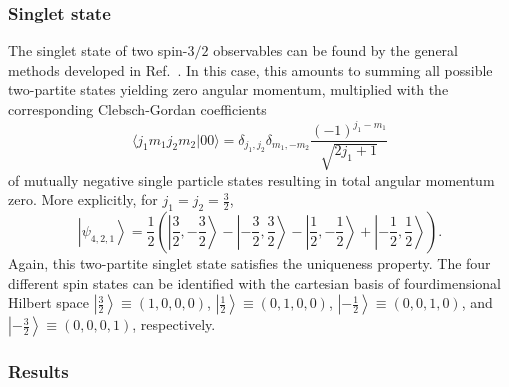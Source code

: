 \documentclass[fleqn,twoside]{article}      %
\begin{document}
\subsubsection*{Singlet state}

The singlet state of two spin-$3/2$ observables
can be found by the general methods developed in Ref.~\cite{schimpf-svozil}.
In this case, this amounts to summing all possible two-partite states yielding zero angular momentum,
multiplied with the corresponding  Clebsch-Gordan coefficients
\begin{equation}
\langle j_1m_1j_2m_2\vert 00\rangle = \delta_{j_1,j_2}  \delta_{m_1,-m_2} \frac{(-1)^{j_1-m_1}}{\sqrt{2j_1+1}}
\label{2009-gtq-cgordon0}
\end{equation}
of mutually negative single particle states resulting in total angular momentum zero.
More explicitly,  for $j_1=j_2=\frac{3}{2}$,
\begin{equation}
\left|  \left. \psi_{4,2,1} \right\rangle  \right. =
\frac{1}{2} \left(
\left| \left. \frac{3}{2}, -\frac{3}{2}\right\rangle \right.
 - \left| \left.  -\frac{3}{2}, \frac{3}{2}\right\rangle    \right.
- \left| \left.  \frac{1}{2}, -\frac{1}{2}\right\rangle  \right.
+ \left| \left.  -\frac{1}{2}, \frac{1}{2}\right\rangle   \right.
\right).
\end{equation}
Again, this two-partite singlet state satisfies the uniqueness property.
The four different spin states can be identified with the cartesian basis of fourdimensional Hilbert space
$\left| \left. \frac{3}{2}\right\rangle \right. \equiv (1,0,0,0)$,
$\left| \left. \frac{1}{2}\right\rangle \right. \equiv (0,1,0,0)$,
$\left| \left. -\frac{1}{2}\right\rangle \right. \equiv (0,0,1,0)$,
and
$\left| \left. -\frac{3}{2}\right\rangle \right. \equiv (0,0,0,1)$,
respectively.

\subsubsection*{Results}
\end{document}

